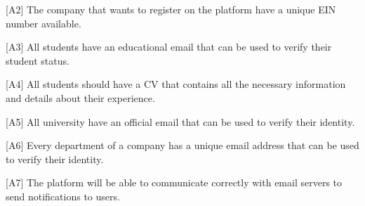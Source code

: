 [A2] The company that wants to register on the platform have a unique EIN number available.

[A3] All students have an educational email that can be used to verify their student status.

[A4] All students should have a CV that contains all the necessary information and details about their experience.

[A5] All university have an official email that can be used to verify their identity.

[A6] Every department of a company has a unique email address that can be used to verify their identity.

[A7] The platform will be able to communicate correctly with email servers to send notifications to users.
